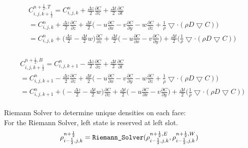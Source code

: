 \documentclass{article}
\numberwithin{equation}{subsection}
\begin{document}
\begin{align}
\begin{split}
& C_{i,j,k+\frac{1}{2}}^{n+\frac{1}{2},T} = C_{i,j,k}^n + \frac{\Delta z}{2} \frac{\partial C}{\partial z} + \frac{\Delta t}{2} \frac{\partial C}{\partial t} \\
& = C_{i,j,k}^{n} + \frac{\Delta z}{2} \frac{\partial C}{\partial z} + \frac{\Delta t}{2} \Big( -u\frac{\partial C}{\partial x} - v\frac{\partial C}{\partial y} - w\frac{\partial C}{\partial z} + \frac{1}{\rho} \bigtriangledown \cdot( \rho D \bigtriangledown C) \Big) \\
& = C_{i,j,k}^{n} + \Big( \frac{\Delta z}{2} - \frac{\Delta t}{2}w\Big)\frac{\partial C}{\partial z} + \frac{\Delta t}{2} \Big( -u\frac{\partial C}{\partial x} -v\frac{\partial C}{\partial y} \big) + \frac{\Delta t}{2} \Big( \frac{1}{\rho} \bigtriangledown \cdot( \rho D \bigtriangledown C)\Big)
\end{split}
\end{align}

\begin{align}
\begin{split}
& C_{i,j,k+\frac{1}{2}}^{n+\frac{1}{2},B} = C_{i,j,k+1}^n - \frac{\Delta z}{2} \frac{\partial C}{\partial z} + \frac{\Delta t}{2} \frac{\partial C}{\partial t} \\
& = C_{i,j,k+1}^{n} - \frac{\Delta z}{2} \frac{\partial C}{\partial z} + \frac{\Delta t}{2} \Big( -u\frac{\partial C}{\partial x} - v\frac{\partial C}{\partial y} - w\frac{\partial C}{\partial z} + \frac{1}{\rho} \bigtriangledown \cdot( \rho D \bigtriangledown C) \Big) \\
& = C_{i,j,k+1}^{n} + \Big( -\frac{\Delta z}{2} - \frac{\Delta t}{2}w\Big)\frac{\partial C}{\partial z} + \frac{\Delta t}{2} \Big( -u\frac{\partial C}{\partial x} -v\frac{\partial C}{\partial y} \big) + \frac{\Delta t}{2} \Big( \frac{1}{\rho} \bigtriangledown \cdot( \rho D \bigtriangledown C)\Big)
\end{split}
\end{align}




Riemann Solver to determine unique densities on each face:\\
For the Riemann Solver, left state is reserved at left slot.
\begin{equation}
\rho^{n+\frac{1}{2}}_{i-\frac{1}{2},j,k} = \verb|Riemann_Solver|(\rho^{n+\frac{1}{2},E}_{i-\frac{1}{2},j,k}, \rho^{n+\frac{1}{2},W}_{i-\frac{1}{2},j,k})
\end{equation}
\end{document}
